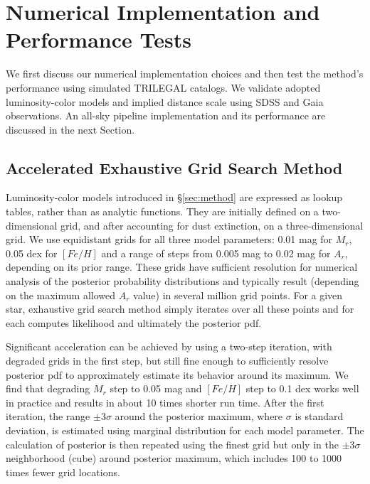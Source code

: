 % 

\section{Numerical Implementation and Performance Tests \label{sec:tests}}

We first discuss our numerical implementation choices and then test the method's performance using simulated TRILEGAL catalogs. We
validate adopted luminosity-color models and implied distance scale using SDSS and Gaia observations. An all-sky pipeline implementation
and its performance are discussed in the next Section. 

\subsection{Accelerated Exhaustive Grid Search Method}

Luminosity-color models introduced in \S\ref{sec:method} are expressed as lookup tables, rather than as analytic functions. They are initially defined
on a two-dimensional grid, and after accounting for dust extinction, on a three-dimensional grid. We use equidistant grids for all three
model parameters: 0.01 mag for $M_r$, 0.05 dex for $[Fe/H]$ and a range of steps from 0.005 mag to 0.02 mag for $A_r$, depending on its
prior range. These grids have sufficient resolution for numerical analysis of the posterior probability distributions and typically
result (depending on the maximum allowed $A_r$ value) in several million grid points. For a given star, exhaustive grid search method simply iterates
over all these points and for each computes likelihood and ultimately the posterior pdf. 

Significant acceleration can be achieved by using a two-step iteration, with degraded grids in the first step, but still fine
enough to sufficiently resolve posterior pdf to approximately estimate its behavior around its maximum. We find that degrading $M_r$ step to 0.05 mag and
$[Fe/H]$ step to 0.1 dex works well in practice and results in about 10 times shorter run time. After the first iteration, the range $\pm 3
\sigma$ around the posterior  maximum, where $\sigma$ is standard deviation, is estimated using marginal distribution for each model
parameter. The calculation of posterior is then repeated
using the finest grid but only in the $\pm 3 \sigma$  neighborhood (cube) around posterior maximum, which includes 100 to 1000 times fewer grid locations. 

